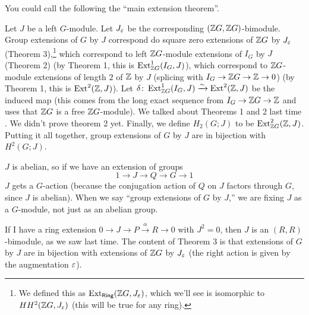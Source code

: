 
You could call the following the ``main extension theorem''.

Let $J$ be a left $G$-module. Let $J_\varepsilon$ be the corresponding $(\mathbb{Z} G,\mathbb{Z} G)$-bimodule. Group extensions of $G$ by $J$ correspond do square zero extensions of $\mathbb{Z} G$ by $J_\varepsilon$ (Theorem 3),\footnote{We defined this as $\operatorname{Ext}_{\text{\sf Ring}}(\mathbb{Z} G,J_\varepsilon)$, which we'll see is isomorphic to $HH^2(\mathbb{Z} G,J_\varepsilon)$ (this will be true for any ring).} which correspond to left $\mathbb{Z} G$-module extensions of $I_G$ by $J$ (Theorem 2) (by Theorem 1, this is $\operatorname{Ext}^1_{\mathbb{Z} G}(I_G,J)$), which correspond to $\mathbb{Z} G$-module extensions of length $2$ of $\mathbb{Z}$ by $J$ (splicing with $I_G\to \mathbb{Z} G\to \mathbb{Z}\to 0$) (by Theorem 1, this is $\operatorname{Ext}^2(\mathbb{Z},J)$). Let $\delta\colon \operatorname{Ext}^1_{\mathbb{Z} G}(I_G,J)\xrightarrow\sim \operatorname{Ext}^2(\mathbb{Z},J)$ be the induced map (this comes from the long exact sequence from $I_G\to \mathbb{Z} G\to \mathbb{Z}$ and uses that $\mathbb{Z} G$ is a free $\mathbb{Z} G$-module). We talked about Theorems 1 and 2 last time . We didn't prove theorem 2 yet. Finally, we define $H_2(G;J)$ to be $\operatorname{Ext}^2_{\mathbb{Z} G}(\mathbb{Z},J)$. Putting it all together, group extensions of $G$ by $J$ are in bijection with $H^2(G;J)$.

$J$ is abelian, so if we have an extension of groups
\[
 1\to J\to Q\to G\to 1
\]
$J$ gets a $G$-action (because the conjugation action of $Q$ on $J$ factors through $G$, since $J$ is abelian). When we say ``group extensions of $G$ by $J$,'' we are fixing $J$ as a $G$-module, not just as an abelian group.

If I have a ring extension $0\to J\to P\xrightarrow \alpha R\to 0$ with $J^2=0$, then $J$ is an $(R,R)$-bimodule, as we saw last time. The content of Theorem 3 is that extensions of $G$ by $J$ are in bijection with extensions of $\mathbb{Z} G$ by $J_\varepsilon$ (the right action is given by the augmentation $\varepsilon$).

